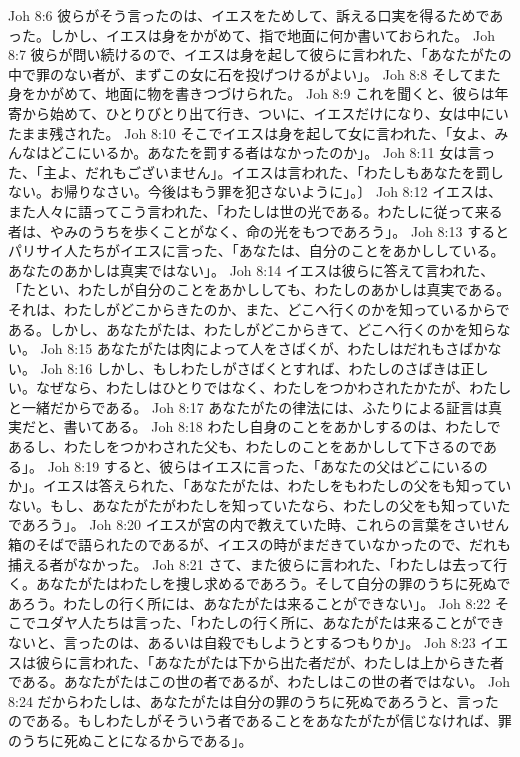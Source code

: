Joh 8:6  彼らがそう言ったのは、イエスをためして、訴える口実を得るためであった。しかし、イエスは身をかがめて、指で地面に何か書いておられた。
Joh 8:7  彼らが問い続けるので、イエスは身を起して彼らに言われた、「あなたがたの中で罪のない者が、まずこの女に石を投げつけるがよい」。
Joh 8:8  そしてまた身をかがめて、地面に物を書きつづけられた。
Joh 8:9  これを聞くと、彼らは年寄から始めて、ひとりびとり出て行き、ついに、イエスだけになり、女は中にいたまま残された。
Joh 8:10  そこでイエスは身を起して女に言われた、「女よ、みんなはどこにいるか。あなたを罰する者はなかったのか」。
Joh 8:11  女は言った、「主よ、だれもございません」。イエスは言われた、「わたしもあなたを罰しない。お帰りなさい。今後はもう罪を犯さないように」。〕
Joh 8:12  イエスは、また人々に語ってこう言われた、「わたしは世の光である。わたしに従って来る者は、やみのうちを歩くことがなく、命の光をもつであろう」。
Joh 8:13  するとパリサイ人たちがイエスに言った、「あなたは、自分のことをあかししている。あなたのあかしは真実ではない」。
Joh 8:14  イエスは彼らに答えて言われた、「たとい、わたしが自分のことをあかししても、わたしのあかしは真実である。それは、わたしがどこからきたのか、また、どこへ行くのかを知っているからである。しかし、あなたがたは、わたしがどこからきて、どこへ行くのかを知らない。
Joh 8:15  あなたがたは肉によって人をさばくが、わたしはだれもさばかない。
Joh 8:16  しかし、もしわたしがさばくとすれば、わたしのさばきは正しい。なぜなら、わたしはひとりではなく、わたしをつかわされたかたが、わたしと一緒だからである。
Joh 8:17  あなたがたの律法には、ふたりによる証言は真実だと、書いてある。
Joh 8:18  わたし自身のことをあかしするのは、わたしであるし、わたしをつかわされた父も、わたしのことをあかしして下さるのである」。
Joh 8:19  すると、彼らはイエスに言った、「あなたの父はどこにいるのか」。イエスは答えられた、「あなたがたは、わたしをもわたしの父をも知っていない。もし、あなたがたがわたしを知っていたなら、わたしの父をも知っていたであろう」。
Joh 8:20  イエスが宮の内で教えていた時、これらの言葉をさいせん箱のそばで語られたのであるが、イエスの時がまだきていなかったので、だれも捕える者がなかった。
Joh 8:21  さて、また彼らに言われた、「わたしは去って行く。あなたがたはわたしを捜し求めるであろう。そして自分の罪のうちに死ぬであろう。わたしの行く所には、あなたがたは来ることができない」。
Joh 8:22  そこでユダヤ人たちは言った、「わたしの行く所に、あなたがたは来ることができないと、言ったのは、あるいは自殺でもしようとするつもりか」。
Joh 8:23  イエスは彼らに言われた、「あなたがたは下から出た者だが、わたしは上からきた者である。あなたがたはこの世の者であるが、わたしはこの世の者ではない。
Joh 8:24  だからわたしは、あなたがたは自分の罪のうちに死ぬであろうと、言ったのである。もしわたしがそういう者であることをあなたがたが信じなければ、罪のうちに死ぬことになるからである」。
